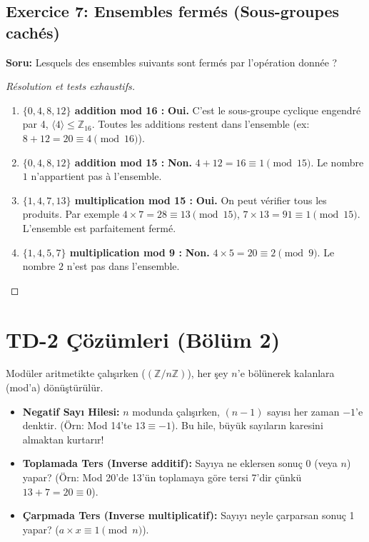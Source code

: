 \documentclass[12pt,a4paper]{report}
\begin{document}
\subsection*{Exercice 7: Ensembles fermés (Sous-groupes cachés)}
\textbf{Soru:} Lesquels des ensembles suivants sont fermés par l'opération donnée ?
\begin{proof}[Résolution et tests exhaustifs]
\begin{enumerate}
    \item[(a)] \textbf{$\{0, 4, 8, 12\}$ addition mod 16 :} \textbf{Oui.} C'est le sous-groupe cyclique engendré par 4, $\langle 4 \rangle \leq \mathbb{Z}_{16}$. Toutes les additions restent dans l'ensemble (ex: $8+12 = 20 \equiv 4 \pmod{16}$).
    \item[(b)] \textbf{$\{0, 4, 8, 12\}$ addition mod 15 :} \textbf{Non.} $4+12 = 16 \equiv 1 \pmod{15}$. Le nombre $1$ n'appartient pas à l'ensemble.
    \item[(c)] \textbf{$\{1, 4, 7, 13\}$ multiplication mod 15 :} \textbf{Oui.} On peut vérifier tous les produits. Par exemple $4 \times 7 = 28 \equiv 13 \pmod{15}$, $7 \times 13 = 91 \equiv 1 \pmod{15}$. L'ensemble est parfaitement fermé.
    \item[(d)] \textbf{$\{1, 4, 5, 7\}$ multiplication mod 9 :} \textbf{Non.} $4 \times 5 = 20 \equiv 2 \pmod{9}$. Le nombre $2$ n'est pas dans l'ensemble.
\end{enumerate}
\end{proof}

\section{TD-2 Çözümleri (Bölüm 2)}

\begin{tcolorbox}[colback=green!5!white,colframe=green!60!black,title=Hatırlatma: Modulo (Mod) Aritmetiğinde İşlemler ve Ters Alma]
Modüler aritmetikte çalışırken ($(\mathbb{Z}/n\mathbb{Z})$), her şey $n$'e bölünerek kalanlara (mod'a) dönüştürülür.
\begin{itemize}
    \item \textbf{Negatif Sayı Hilesi:} $n$ modunda çalışırken, $(n-1)$ sayısı her zaman $-1$'e denktir. (Örn: Mod 14'te $13 \equiv -1$). Bu hile, büyük sayıların karesini almaktan kurtarır!
    \item \textbf{Toplamada Ters (Inverse additif):} Sayıya ne eklersen sonuç 0 (veya $n$) yapar? (Örn: Mod 20'de 13'ün toplamaya göre tersi 7'dir çünkü $13+7=20\equiv0$).
    \item \textbf{Çarpmada Ters (Inverse multiplicatif):} Sayıyı neyle çarparsan sonuç 1 yapar? ($a \times x \equiv 1 \pmod n$).
\end{itemize}
\end{tcolorbox}
\end{document}

